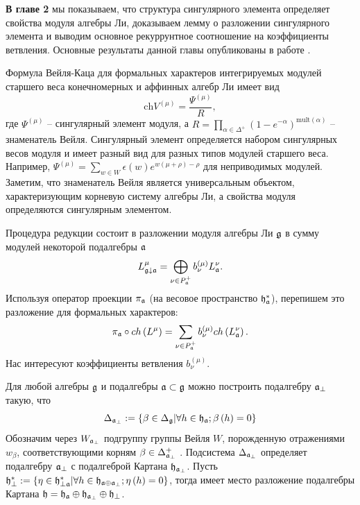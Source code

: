 \documentclass[14pt,autoref,href,facsimile
]{disser}
\begin{document}
\textbf{В главе 2} мы показываем, что структура сингулярного элемента определяет свойства модуля алгебры Ли, доказываем лемму о разложении сингулярного элемента и выводим основное рекуррунтное соотношение на коэффициенты ветвления. Основные результаты данной главы опубликованы в работе . 

Формула Вейля-Каца для формальных характеров интегрируемых модулей старшего веса конечномерных и аффинных алгебр Ли имеет вид
\begin{equation}
  \label{eq:1}
  \mathrm{ch} V^{(\mu)} = \frac{\Psi^{(\mu)}}{R},
\end{equation}
где $\Psi^{(\mu)}$ -- сингулярный элемент модуля, а $R=\prod_{\alpha\in \Delta^+}(1-e^{-\alpha})^{\mathrm{mult}(\alpha)}$ -- знаменатель Вейля. Сингулярный элемент определяется набором сингулярных весов модуля и имеет разный вид для разных типов модулей старшего веса. Например, $\Psi^{(\mu)}=\sum_{w\in W} \epsilon(w) e^{w(\mu+\rho)-\rho}$ для неприводимых модулей. Заметим, что знаменатель Вейля является универсальным объектом, характеризующим корневую систему алгебры Ли, а свойства модуля определяются сингулярным элементом.

Процедура редукции состоит в разложении модуля алгебры Ли $\mathfrak{g}$ в сумму модулей некоторой подалгебры $\mathfrak{a}$
\begin{equation}
  \label{eq:2}
  L_{\mathfrak{g}\downarrow \mathfrak{a}}^{\mu }=\bigoplus
\limits_{\nu \in P_{\mathfrak{a}}^{+}}b_{\nu }^{\left( \mu \right) }L_{\mathfrak{a}}^{\nu }.
\end{equation}
Используя оператор проекции  $\pi_{\mathfrak{a}}$ (на весовое пространство $\mathfrak{h}_{\mathfrak{a}}^*$), перепишем это разложение для формальных характеров:
\begin{equation}
\label{branching1}
 \pi _{\mathfrak{a}}\circ ch\left( L^{\mu }\right)
 =\sum_{\nu \in P_{\mathfrak{a}}^{+}}b_{\nu }^{(\mu)}ch\left( L_{\mathfrak{a}}^{\nu }\right) .
\end{equation}
Нас интересуют коэффициенты ветвления $b^{(\mu)}_{\nu}$.

Для любой алгебры $\mathfrak{g}$ и подалгебры $\mathfrak{a}\subset \mathfrak{g}$ можно построить  подалгебру $\mathfrak{a}_{\perp}$ такую, что 
\begin{equation}
\label{delta-a-ort}
\Delta _{\mathfrak{a}_{\perp }} :=\left\{ \beta \in \Delta _{\mathfrak{g}}|
\forall h \in \mathfrak{h}_{\mathfrak{a}};  \beta\left(h \right)=0  \right\} 
\end{equation}
Обозначим через $W_{\mathfrak{a}_{\perp}}$ подгруппу группы Вейля $W$, порожденную отражениями $w _{\beta }$, соответствующими корням $\beta \in \Delta _{\mathfrak{a}_{\perp}}^{+}$ . Подсистема  $\Delta _{\mathfrak{a}_{\perp }}$ определяет подалгебру $\mathfrak{a}_{\perp }$ с подалгеброй Картана $\mathfrak{h}_{\mathfrak{a}_{\perp}}$.  Пусть
$\mathfrak{h}_{\perp }^{\ast }:=\left\{ \eta \in \mathfrak{h}_{\perp \mathfrak{a}}^{\ast
}|\forall h \in \mathfrak{h}_{\mathfrak{a}\oplus \mathfrak{a}_{\perp}}; \eta \left( h \right)=0 \right\}$, тогда имеет место разложение подалгебры Картана $\mathfrak{h}=\frak{\mathfrak{h}_{\mathfrak{a}}}\oplus \mathfrak{h}_{\mathfrak{a}_{\perp}}\oplus\mathfrak{h}_{\perp }$.
\end{document}
